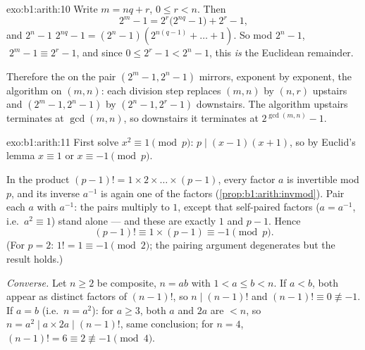 \begin{solution}{exo:b1:arith:10}
Write $m = nq + r$, $0 \leq r < n$. Then
\[
2^m - 1 = 2^r\bigl(2^{nq} - 1\bigr) + 2^r - 1,
\]
and $2^n - 1$  $2^{nq} - 1 = (2^n - 1)(2^{n(q-1)} + \dots +
1)$. So mod $2^n - 1$, $\;2^m - 1 \equiv 2^r - 1$, and since $0 \leq
2^r - 1 < 2^n - 1$, this \emph{is} the Euclidean remainder.

Therefore the  on the pair $(2^m - 1, 2^n - 1)$
mirrors, exponent by exponent, the algorithm on $(m, n)$: each
division step replaces $(m, n)$ by $(n, r)$ upstairs and $(2^m - 1,
2^n - 1)$ by $(2^n - 1, 2^r - 1)$ downstairs. The algorithm upstairs
terminates at $\gcd(m,n)$, so downstairs it terminates at
$2^{\gcd(m,n)} - 1$.
\end{solution}

\begin{solution}{exo:b1:arith:11}
First solve $x^2 \equiv 1 \pmod p$: $p \mid (x-1)(x+1)$, so by
Euclid's lemma $x \equiv 1$ or $x \equiv -1 \pmod p$.

In the product $(p-1)! = 1 \times 2 \times \dots \times (p-1)$, every
factor $a$ is invertible mod $p$, and its inverse $a^{-1}$ is again
one of the factors (\cref{prop:b1:arith:invmod}). Pair each $a$ with
$a^{-1}$: the pairs multiply to $1$, except that self-paired factors
($a = a^{-1}$, i.e.\ $a^2 \equiv 1$) stand alone --- and these are
exactly $1$ and $p - 1$. Hence
\[
(p-1)! \equiv 1 \times (p - 1) \equiv -1 \pmod p .
\]
(For $p = 2$: $1! = 1 \equiv -1 \pmod 2$; the pairing argument
degenerates but the result holds.)

\emph{Converse.} Let $n \geq 2$ be composite, $n = ab$ with $1 < a
\leq b < n$. If $a < b$, both appear as distinct factors of $(n-1)!$,
so $n \mid (n-1)!$ and $(n-1)! \equiv 0 \not\equiv -1$. If $a = b$
(i.e.\ $n = a^2$): for $a \geq 3$, both $a$ and $2a$ are $< n$, so
$n = a^2 \mid a \times 2a \mid (n-1)!$, same conclusion; for $n = 4$,
$(n-1)! = 6 \equiv 2 \not\equiv -1 \pmod 4$.
\end{solution}

